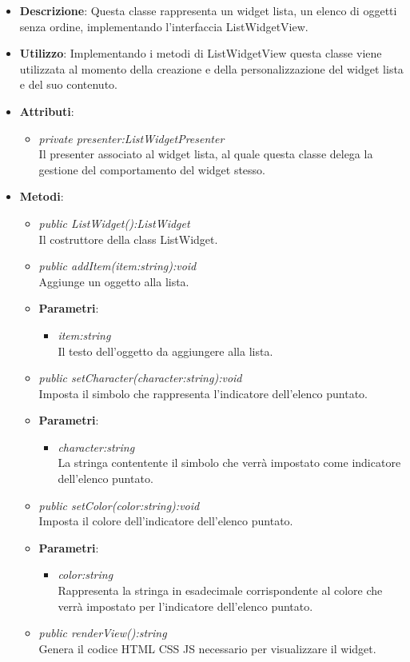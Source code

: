\begin{itemize}
\item \textbf{Descrizione}: Questa classe rappresenta un widget lista, un elenco di oggetti senza ordine, implementando l'interfaccia ListWidgetView.
\item \textbf{Utilizzo}: Implementando i metodi di ListWidgetView questa classe viene utilizzata al momento della creazione e della personalizzazione del widget lista e del suo contenuto.
\item \textbf{Attributi}:
	\begin{itemize}
	\item \textit{private presenter:ListWidgetPresenter}\\
	Il presenter associato al widget lista, al quale questa classe delega la gestione del comportamento del widget stesso.
	\end{itemize}
\item \textbf{Metodi}:
	\begin{itemize}
	\item \textit{public ListWidget():ListWidget}\\
	Il costruttore della class ListWidget.
	\item \textit{public addItem(item:string):void}\\
	Aggiunge un oggetto alla lista.
		\item{\textbf{Parametri}: \begin{itemize}
		\item \textit{item:string}\\
		Il testo dell'oggetto da aggiungere alla lista.
		\end{itemize}}
	\item \textit{public setCharacter(character:string):void}\\
	Imposta il simbolo che rappresenta l'indicatore dell'elenco puntato.
		\item{\textbf{Parametri}: \begin{itemize}
		\item \textit{character:string}\\
		La stringa contentente il simbolo che verrà impostato come indicatore dell'elenco puntato.
		\end{itemize}}
	\item \textit{public setColor(color:string):void}\\
	Imposta il colore dell'indicatore dell'elenco puntato.
		\item{\textbf{Parametri}: \begin{itemize}
		\item \textit{color:string}\\
		Rappresenta la stringa in esadecimale corrispondente al colore che verrà impostato per l'indicatore dell'elenco puntato.
		\end{itemize}}
	\item \textit{public renderView():string}\\
	Genera il codice HTML CSS JS necessario per visualizzare il widget.
	\end{itemize}
\end{itemize}

